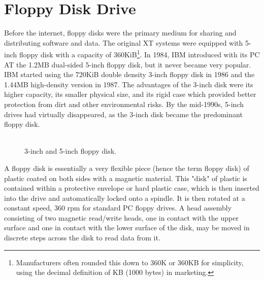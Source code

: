 \documentclass[book.tex]{subfiles}
\begin{document}
\section{Floppy Disk Drive}
Before the internet, floppy disks were the primary medium for sharing and distributing software and data. The original XT systems were equipped with 5-inch floppy disk with a capacity of 360KiB\footnote{Manufacturers often rounded this down to 360K or 360KB for simplicity, using the decimal definition of KB (1000 bytes) in marketing.}. In 1984, IBM introduced with its PC AT the 1.2MB dual-sided 5-inch floppy disk, but it never became very popular. IBM started using the 720KiB double density 3-inch floppy disk in 1986 and the 1.44MB high-density version in 1987. The advantages of the 3-inch disk were its higher capacity, its smaller physical size, and its rigid case which provided better protection from dirt and other environmental risks. By the mid-1990s, 5-inch drives had virtually disappeared, as the 3-inch disk became the predominant floppy disk. \\

\vspace{10pt}
\\
\par

\begin{figure}[H]

  \begin{minipage}{0.5\textwidth}
  \centering
  \end{minipage}
  \hfill
  \begin{minipage}{0.5\textwidth}
  \centering
  \end{minipage}
  \caption{3-inch and 5-inch floppy disk.}
  \end{figure}
\par


A floppy disk is essentially a very flexible piece (hence the term floppy disk) of plastic coated on both sides with a magnetic material. This "disk" of plastic is contained within a protective envelope or hard plastic case, which is then inserted into the drive and automatically locked onto a spindle. It is then rotated at a constant speed, 360 rpm for standard PC floppy drives. A head assembly consisting of two magnetic read/write heads, one in contact with the upper surface and one in contact with the lower surface of the disk, may be moved in discrete steps across the disk to read data from it.
\end{document}
